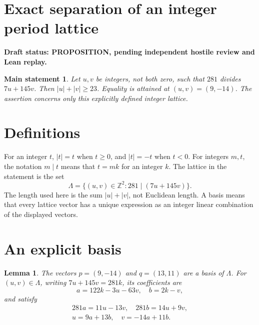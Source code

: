\documentclass{article}
\newtheorem{lemma}{Lemma}
\newtheorem*{mainstatement}{Main statement}
\begin{document}
\section{Exact separation of an integer period lattice}\label{sec:title}

\textbf{Draft status: PROPOSITION, pending independent hostile review and Lean replay.}

\begin{mainstatement}
  Let \(u, v\) be integers, not both zero, such that \(281\) divides \(7u + 145v\). Then
  \(\lvert u\rvert + \lvert v\rvert \ge 23\). Equality is attained at
  \((u, v) = (9, -14)\). The assertion concerns only this explicitly defined integer
  lattice.
\end{mainstatement}

\section{Definitions}\label{sec:definitions}

For an integer \(t\), \(\lvert t\rvert = t\) when \(t \ge 0\), and \(\lvert t\rvert = -t\)
when \(t < 0\). For integers \(m, t\), the notation \(m \mid t\) means that \(t = mk\) for
an integer \(k\). The lattice in the statement is the set
\begin{equation}
  \Lambda = \{(u, v) \in \mathbb{Z}^2 : 281 \mid (7u + 145v)\}.
\end{equation}
The length used here is the sum \(\lvert u\rvert + \lvert v\rvert\), not Euclidean length.
A basis means that every lattice vector has a unique expression as an integer linear
combination of the displayed vectors.

\section{An explicit basis}\label{sec:basis}

\begin{lemma}\label{lem:basis}
  The vectors \(p = (9, -14)\) and \(q = (13, 11)\) are a basis of \(\Lambda\). For
  \((u, v) \in \Lambda\), writing \(7u + 145v = 281k\), its coefficients are
  \begin{equation}
    a = 122k - 3u - 63v, \quad b = 2k - v,
  \end{equation}
  and satisfy
  \begin{gather}
    281a = 11u - 13v, \quad 281b = 14u + 9v, \\
    u = 9a + 13b, \quad v = -14a + 11b.
  \end{gather}
\end{lemma}
\end{document}
